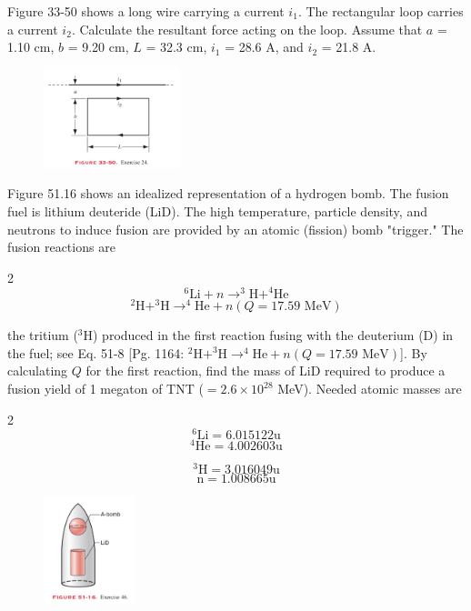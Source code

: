 \documentclass[11pt,letterpaper,boxed]{pset}
\begin{document}
    \begin{problem} [*E33.24]
    Figure 33-50 shows a long wire carrying a current $i_1$. The rectangular loop carries a current $i_2$. Calculate the resultant force acting on the loop. Assume that $a$ = 1.10 cm, $b$ = 9.20 cm, $L$ = 32.3 cm, $i_1$ = 28.6 A, and $i_2$ = 21.8 A.
    \end{problem}
    \begin{figure} [ht]
        \includegraphics[width=150px]{HW6Images/33-24.png}
        \label{fig:P33-24}
    \end{figure}
    \newpage
    
    \begin{problem} [E51.46]
    Figure 51.16 shows an idealized representation of a hydrogen bomb. The fusion fuel is lithium deuteride (LiD). The high temperature, particle density, and neutrons to induce fusion are provided by an atomic (fission) bomb "trigger." The fusion reactions are
    
    \begin{multicols} {2}
    $$^6\text{Li} + n \longrightarrow ^3\text{H} + ^4\text{He}$$ \smallskip $$^2\text{H} + ^3\text{H} \longrightarrow ^4\text{He} + n (Q = \text{17.59 MeV})$$
    \end{multicols}
    
    the tritium ($^3$H) produced in the first reaction fusing with the deuterium (D) in the fuel; see Eq. 51-8 [Pg. 1164: $^2\text{H} + ^3\text{H} \longrightarrow ^4\text{He} + n (Q = \text{17.59 MeV})$]. By calculating $Q$ for the first reaction, find the mass of LiD required to produce a fusion yield of 1 megaton of TNT ($=2.6\times10^{28}$ MeV). Needed atomic masses are
    
    \begin{multicols} {2}
    $$^6 \text{Li} = 6.015122 \text{u}$$ $$^4 \text{He} = 4.002603 \text{u}$$
    
    $$^3 \text{H} = 3.016049 \text{u}$$ $$\text{n} = 1.008665 \text{u}$$
    \end{multicols}
    
    \end{problem}
    \begin{figure} [ht]
        \includegraphics[width=100px]{HW6Images/51-46.png}
        \label{fig:E51-46}
    \end{figure}
    \newpage
\end{document}

